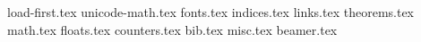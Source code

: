 
{load-first.tex}
{unicode-math.tex}
{fonts.tex}
{indices.tex}
{links.tex}
{theorems.tex}
{math.tex}
{floats.tex}
{counters.tex}
{bib.tex}
{misc.tex}
{beamer.tex}
